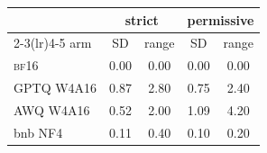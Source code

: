 \begin{tabular}{lcccc}
\toprule
& \multicolumn{2}{c}{strict} & \multicolumn{2}{c}{permissive} \\
\cmidrule(lr){2-3}\cmidrule(lr){4-5}
arm & SD & range & SD & range \\
\midrule
\textsc{bf16} & 0.00 & 0.00 & 0.00 & 0.00 \\
GPTQ W4A16 & 0.87 & 2.80 & 0.75 & 2.40 \\
AWQ W4A16 & 0.52 & 2.00 & 1.09 & 4.20 \\
bnb NF4 & 0.11 & 0.40 & 0.10 & 0.20 \\
\bottomrule
\end{tabular}
